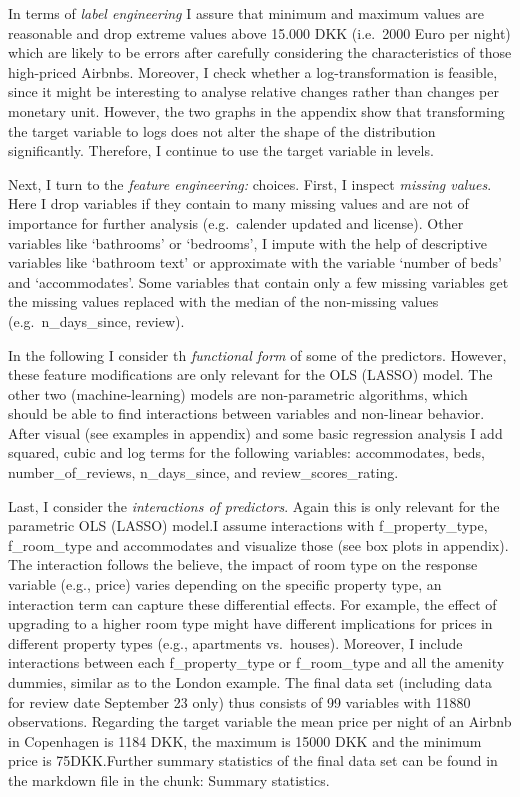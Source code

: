 \documentclass[
]{article}
\begin{document}
In terms of \emph{label engineering} I assure that minimum and maximum
values are reasonable and drop extreme values above 15.000 DKK
(i.e.~2000 Euro per night) which are likely to be errors after carefully
considering the characteristics of those high-priced Airbnbs. Moreover,
I check whether a log-transformation is feasible, since it might be
interesting to analyse relative changes rather than changes per monetary
unit. However, the two graphs in the appendix show that transforming the
target variable to logs does not alter the shape of the distribution
significantly. Therefore, I continue to use the target variable in
levels.

Next, I turn to the \emph{feature engineering:} choices. First, I
inspect \emph{missing values}. Here I drop variables if they contain to
many missing values and are not of importance for further analysis
(e.g.~calender updated and license). Other variables like `bathrooms' or
`bedrooms', I impute with the help of descriptive variables like
`bathroom text' or approximate with the variable `number of beds' and
`accommodates'. Some variables that contain only a few missing variables
get the missing values replaced with the median of the non-missing
values (e.g.~n\_days\_since, review).

In the following I consider th \emph{functional form} of some of the
predictors. However, these feature modifications are only relevant for
the OLS (LASSO) model. The other two (machine-learning) models are
non-parametric algorithms, which should be able to find interactions
between variables and non-linear behavior. After visual (see examples in
appendix) and some basic regression analysis I add squared, cubic and
log terms for the following variables: accommodates, beds,
number\_of\_reviews, n\_days\_since, and review\_scores\_rating.

Last, I consider the \emph{interactions of predictors}. Again this is
only relevant for the parametric OLS (LASSO) model.I assume interactions
with f\_property\_type, f\_room\_type and accommodates and visualize
those (see box plots in appendix). The interaction follows the believe,
the impact of room type on the response variable (e.g., price) varies
depending on the specific property type, an interaction term can capture
these differential effects. For example, the effect of upgrading to a
higher room type might have different implications for prices in
different property types (e.g., apartments vs.~houses). Moreover, I
include interactions between each f\_property\_type or f\_room\_type and
all the amenity dummies, similar as to the London example. The final
data set (including data for review date September 23 only) thus
consists of 99 variables with 11880 observations. Regarding the target
variable the mean price per night of an Airbnb in Copenhagen is 1184
DKK, the maximum is 15000 DKK and the minimum price is 75DKK.Further
summary statistics of the final data set can be found in the markdown
file in the chunk: Summary statistics.
\end{document}
